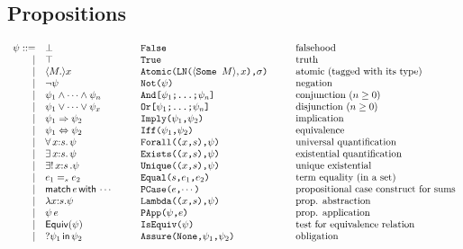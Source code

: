 \documentclass[12pt]{article}
\newcommand{\M}{M}
\newcommand{\e}{e}
\newcommand{\s}{s}
\newcommand{\n}{x} %
\newcommand{\p}{\psi} %
\newcommand{\pt}{\sigma} %
\newcommand{\x}{\n} %
\newcommand{\pFalse}{\bot}
\newcommand{\pTrue}{\top}
\newcommand{\pNot}[1]{\lnot #1}
\newcommand{\pAnd}[2]{#1_1\wedge\cdots\wedge #1_{#2}}
\newcommand{\pOr}[2]{#1_1\vee\cdots\vee #1_{#2}}
\newcommand{\pImply}[2]{#1 \Rightarrow #2}
\newcommand{\pEquiv}[2]{#1 \Leftrightarrow #2}
\newcommand{\pForall}[3]{\forall\, #1{:}#2.\,#3}
\newcommand{\pExists}[3]{\exists\, #1{:}#2.\,#3}
\newcommand{\pUnique}[3]{\exists!\, #1{:}#2\,.#3}
\begin{document}
\subsection{Propositions}
\[
\begin{array}{rl@{\hspace{1cm}}l@{\hspace{1cm}}l}
\p ::= & \pFalse & \texttt{False} & \mbox{falsehood}\\
 |&\pTrue & \texttt{True} & \mbox{truth} \\
 |&\langle\M.\rangle\n & \texttt{Atomic(LN($\langle$Some $\M\rangle,\n$),$\pt$)} & \mbox{atomic (tagged with its type)}\\
 |&\pNot{\p}&\texttt{Not($\p$)}&\mbox{negation}\\
 |&\pAnd{\p}{n}&\texttt{And[$\p_1$;\ldots;$\p_n$]} & \mbox{conjunction ($n\geq 0$)}\\
 |&\pOr{\p}{\n}& \texttt{Or[$\p_1$;\ldots;$\p_n$]} & \mbox{disjunction ($n\geq 0$)}\\
 |&\pImply{\p_1}{\p_2}& \texttt{Imply($\p_1$,$\p_2$)} & \mbox{implication}\\
 |&\pEquiv{\p_1}{\p_2}& \texttt{Iff($\p_1$,$\p_2$)} & \mbox{equivalence}\\
 |&\pForall{\x}{\s}{\p}&\texttt{Forall(($\x$,$\s$),$\p$)} & \mbox{universal quantification}\\
 |&\pExists{\x}{\s}{\p}&\texttt{Exists(($\x$,$\s$),$\p$)} & \mbox{existential quantification}\\
 |&\pUnique{\x}{\s}{\p}&\texttt{Unique(($\x$,$\s$),$\p$)} & \mbox{unique existential}\\
 |&\e_1=_{\s} \e_2& \texttt{Equal($\s$,$\e_1$,$\e_2$)} & \mbox{term equality (in a set)}\\
 |&\mathsf{match}\,\e\,\mathsf{with}\,\cdots & 
 \texttt{PCase($\e$,$\cdots$)} & \mbox{propositional case construct for sums}\\
 |&\lambda\x{:}\s.\p&\texttt{Lambda(($\x$,$\s$),$\p$)} & \mbox{prop. abstraction}\\
 |&\p\,\e&\texttt{PApp($\p$,$\e$)} & \mbox{prop. application}\\
 |&\mathsf{Equiv}(\p) & \texttt{IsEquiv($\p$)} & \mbox{test for equivalence relation}\\
 |&?\p_1\,\mathsf{in}\,\p_2&\texttt{Assure(None,$\p_1$,$\p_2$)} & \mbox{obligation}\\
\end{array}
\]
\end{document}
